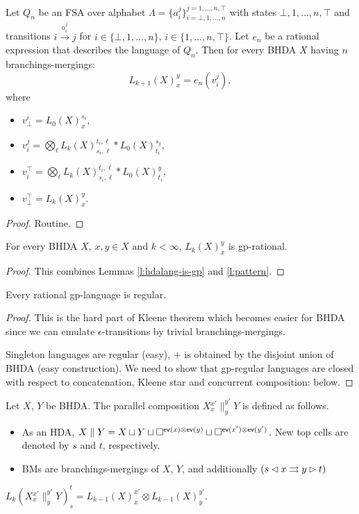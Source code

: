\documentclass[a4paper,english]{lipics-v2021}
\begin{document}
\begin{lemma}
\label{l:pattern}
	Let $Q_n$  be an FSA over alphabet $\Lambda=\{a_i^j\}_{i=\bot,1,\dotsc,n}^{j=1,\dotsc,n,\top}$ with states $\bot,1,\dotsc,n,\top$ and transitions $i\xrightarrow{a_i^j} j$ for $i\in \{\bot,1,\dotsc,n\}$, $i\in \{1,\dotsc,n,\top\}$. Let $e_n$ be a rational expression that describes the language of $Q_n$. Then for every BHDA $X$ having $n$ branchings-mergings:
	\[
		L_{k+1}(X)_x^y=e_n(v_i^j),
	\]
	where
	\begin{itemize}
	\item $v_\bot^i= L_0(X)_x^{s_i}$,
	\item $v_i^j=\bigotimes_\ell L_k(X)_{s_i,\ell}^{t_i,\ell}*L_0(X)_{t_i}^{s_j}$,
	\item $v_i^\top = \bigotimes_\ell L_k(X)_{s_i,\ell}^{t_i,\ell}*L_0(X)_{t_i}^{y}$,
	\item $v_\bot^\top=L_k(X)_x^y$.
	\end{itemize}
\end{lemma}
\begin{proof}
	Routine.
\end{proof}

\begin{lemma}
	For every BHDA $X$, $x,y\in X$ and $k<\infty$, $L_k(X)_x^y$ is gp-rational.
\end{lemma}
\begin{proof}
	This combines Lemmas \ref{l:hdalang-is-gp} and \ref{l:pattern}.
\end{proof}


\begin{proposition}
	Every rational gp-language is regular.
\end{proposition}
\begin{proof}
	This is the hard part of Kleene theorem which becomes easier for BHDA since we can emulate $\epsilon$-transitions by trivial branchings-mergings.
	
	Singleton languages are regular (easy), $+$ is obtained by the disjoint union of BHDA (easy construction). We need to show that gp-regular languages are closed with respect to concatenation, Kleene star and concurrent composition: below.
\end{proof}

\begin{definition}
	Let $X$, $Y$ be BHDA. The parallel composition $X{{}_x^{x'}\parallel_y^{y'}} Y$ is defined as follows.
	\begin{itemize}
	\item As an HDA, $X\parallel Y = X\sqcup Y \sqcup \square^{\textup{\textsf{ev}}(x)\otimes\textup{\textsf{ev}}(y)} \sqcup \square^{\textup{\textsf{ev}}(x')\otimes\textup{\textsf{ev}}(y')}$. New top cells are denoted by $s$ and $t$, respectively.
	\item BMs are branchings-mergings of $X$, $Y$, and additionally $(s\mathbin{\lhd} x \rightrightarrows y\mathbin{\rhd} t)$
	\end{itemize}
\end{definition} 
\begin{lemma}
	$L_k(X{}_x^{x'}\parallel_y^{y'} Y)_s^t=L_{k-1}(X)_x^{x'}\otimes L_{k-1}(X)_y^{y'}$.
\end{lemma}
\end{document}
